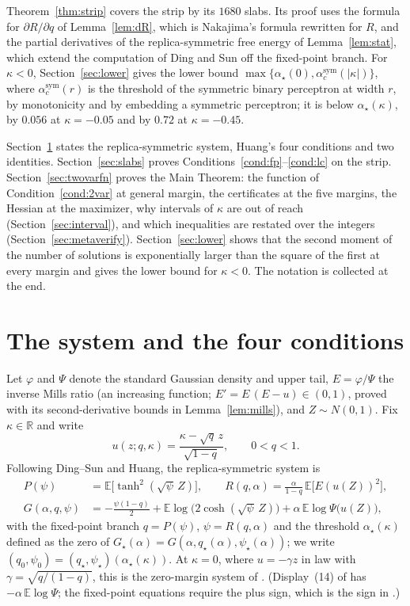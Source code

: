 \documentclass[11pt]{article}
\theoremstyle{remark}
\newcommand{\E}{\mathbb{E}}
\newcommand{\R}{\mathbb{R}}
\begin{document}
Theorem~\ref{thm:strip} covers the strip by its $1680$ slabs.  Its proof uses the
formula for $\partial R/\partial q$ of Lemma~\ref{lem:dR}, which is
Nakajima's formula \cite[eq.~(18)]{nakajima2025} rewritten for $R$, and
the partial derivatives of the replica-symmetric free energy of
Lemma~\ref{lem:stat}, which extend the computation of Ding and Sun
\cite[Lemma~7.1 and Corollary~7.2]{ding2019capacity} off the fixed-point
branch.  For $\kappa<0$, Section~\ref{sec:lower} gives the lower bound
$\max\{\alpha_\star(0),\alpha^{\mathrm{sym}}_c(|\kappa|)\}$, where
$\alpha^{\mathrm{sym}}_c(r)$ is the threshold of the symmetric binary
perceptron at width $r$, by monotonicity and by embedding a symmetric
perceptron; it is below $\alpha_\star(\kappa)$, by $0.056$ at
$\kappa=-0.05$ and by $0.72$ at $\kappa=-0.45$.

Section~\ref{sec:system} states the replica-symmetric system, Huang's
four conditions and two identities.  Section~\ref{sec:slabs} proves
Conditions~\ref{cond:fp}--\ref{cond:lc} on the strip.
Section~\ref{sec:twovarfn} proves the Main Theorem: the function of
Condition~\ref{cond:2var} at general margin, the certificates at the
five margins, the Hessian at the maximizer, why intervals of $\kappa$
are out of reach (Section~\ref{sec:interval}), and which inequalities are
restated over the integers (Section~\ref{sec:metaverify}).
Section~\ref{sec:lower} shows that the second moment of the number of
solutions is exponentially larger than the square of the first at
every margin and gives the lower bound for $\kappa<0$.  The notation is
collected at the end.

\section{The system and the four conditions}\label{sec:system}

Let $\varphi$ and $\Psi$ denote the standard Gaussian density and
upper tail, $E=\varphi/\Psi$ the inverse Mills ratio (an increasing
function; $E'=E\,(E-u)\in(0,1)$, proved with its second-derivative
bounds in Lemma~\ref{lem:mills}), and $Z\sim N(0,1)$.  Fix
$\kappa\in\R$ and write
\[
u(z;q,\kappa)=\frac{\kappa-\sqrt{q}\,z}{\sqrt{1-q}},\qquad 0<q<1 .
\]
Following Ding--Sun and Huang, the replica-symmetric system is
\begin{align}
P(\psi)&=\E\bigl[\tanh^2(\sqrt{\psi}\,Z)\bigr],\qquad
R(q,\alpha)=\frac{\alpha}{1-q}\,\E\bigl[E(u(Z))^2\bigr],
\label{eq:PR}\\
G(\alpha,q,\psi)&=-\frac{\psi(1-q)}{2}
+\E\log\bigl(2\cosh(\sqrt{\psi}\,Z)\bigr)
+\alpha\,\E\log\Psi\bigl(u(Z)\bigr),
\label{eq:G}
\end{align}
with the fixed-point branch $q=P(\psi)$, $\psi=R(q,\alpha)$ and the
threshold $\alpha_\star(\kappa)$ defined as the zero of
$G_\star(\alpha)=G(\alpha,q_\star(\alpha),\psi_\star(\alpha))$; we write
$(q_0,\psi_0)=(q_\star,\psi_\star)(\alpha_\star(\kappa))$.  At
$\kappa=0$, where $u=-\gamma z$ in law with $\gamma=\sqrt{q/(1-q)}$,
this is the zero-margin system of \cite{shmalo2026capacity}.
(Display~(14) of \cite{huang2024capacity} has $-\alpha\,\E\log\Psi$;
the fixed-point equations require the plus sign, which is the sign
in \cite[eq.~(4)]{ding2019capacity}.)
\end{document}
